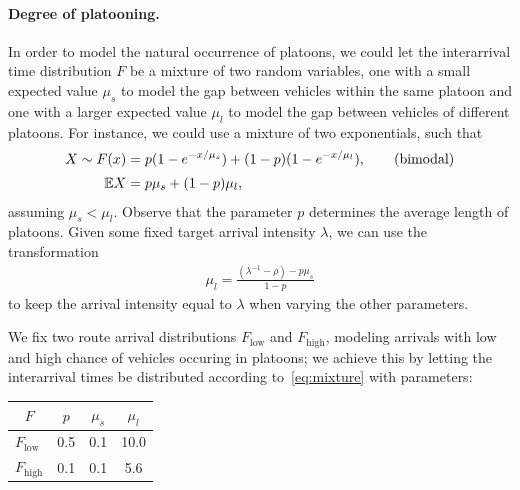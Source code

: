 \documentclass{report}
\theoremstyle{definition}
\theoremstyle{plain}
\begin{document}
\paragraph{Degree of platooning.}
In order to model the natural occurrence of platoons, we could let the interarrival
time distribution $F$ be a mixture of two random variables, one with a small expected
value $\mu_s$ to model the gap between vehicles within the same platoon and one
with a larger expected value $\mu_{l}$ to model the gap between vehicles of
different platoons. For instance, we could use a mixture of two exponentials, such
that
\begin{align}\label{eq:mixture}
  X \sim F(x) &= p ( 1 - e^{-x / \mu_{s}} ) + (1 - p) (1 - e^{-x / \mu_{l}}) , \tag{bimodal} \\[0.2em]
  \mathbb{E}{X} &= p \mu_{s} + (1-p) \mu_{l} , \notag
\end{align}
%
assuming $\mu_{s} < \mu_{l}$. Observe that the parameter $p$ determines the
average length of platoons.
%
Given some fixed target arrival intensity $\lambda$, we can use the transformation
\begin{align*}
  \mu_{l}  = \frac{(\lambda^{-1} - \rho) - p \mu_{s}}{1 - p}
\end{align*}
to keep the arrival intensity equal to $\lambda$ when varying the other
parameters.

We fix two route arrival distributions $F_\mathrm{low}$ and $F_\mathrm{high}$,
modeling arrivals with low and high chance of vehicles occuring in platoons; we
achieve this by letting the interarrival times be distributed according
to~\eqref{eq:mixture} with parameters:

 \begin{center}
  \begin{tabular}{l S[table-format=2.1] S[table-format=2.1] S[table-format=2.1]}
     &  &  &  \\
    \midrule
    $F_\mathrm{low}$  & 0.5 & 0.1 & 10.0 \\
    $F_\mathrm{high}$ & 0.1 & 0.1 &  5.6
  \end{tabular}
 \end{center} 
\end{document}
